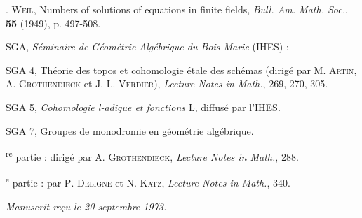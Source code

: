 \documentclass[10pt,leqno]{article}
\begin{document}
\clearpage

\label{physical-36}\par\smallskip

\noindent [\(4] \). \textsc{Weil}, Numbers of solutions of equations in finite fields, \emph{Bull. Am. Math. Soc.}, \textbf{55} (1949), p. 497-508.\par

\noindent SGA, \emph{Séminaire de Géométrie Algébrique du Bois-Marie} (IHES) :\par

\noindent SGA 4, Théorie des topos et cohomologie étale des schémas (dirigé par \(\mathrm{M}\). \textsc{Artin}, \(\mathrm{A}\). \textsc{Grothendieck} et J.-L. \textsc{Verdier}), \emph{Lecture Notes in Math.}, 269, 270, 305.\par

\noindent SGA 5, \emph{Cohomologie l-adique et fonctions \(\mathrm{L}\)}, diffusé par l'IHES.\par

\noindent SGA 7, Groupes de monodromie en géométrie algébrique.\par

\textsuperscript{re} partie : dirigé par \(\mathrm{A}\). \textsc{Grothendieck}, \emph{Lecture Notes in Math.}, 288.\par

\textsuperscript{e} partie : par \(\mathrm{P}\). \textsc{Deligne} et \(\mathrm{N}\). \textsc{Katz}, \emph{Lecture Notes in Math.}, 340.\par

\begin{flushright}\emph{Manuscrit reçu le 20 septembre 1973.}\end{flushright}

\clearpage
\end{document}
